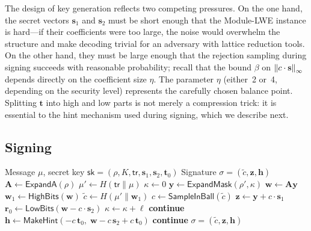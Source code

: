 The design of key generation reflects two competing pressures.  On the one hand, the secret vectors $\mathbf{s}_1$ and $\mathbf{s}_2$ must be short enough that the Module-LWE instance is hard---if their coefficients were too large, the noise would overwhelm the structure and make decoding trivial for an adversary with lattice reduction tools.  On the other hand, they must be large enough that the rejection sampling during signing succeeds with reasonable probability; recall that the bound $\beta$ on $\left\lVert c \cdot \mathbf{s} \right\rVert_\infty$ depends directly on the coefficient size $\eta$.  The parameter $\eta$ (either~2 or~4, depending on the security level) represents the carefully chosen balance point.  Splitting $\mathbf{t}$ into high and low parts is not merely a compression trick: it is essential to the hint mechanism used during signing, which we describe next.

\subsection{Signing}
\label{subsec:ml-dsa-sign}

\begin{algorithm}[t]
\caption{ML-DSA $\Sign$}
\label{alg:ml-dsa-sign}
\begin{algorithmic}[1]
\Require Message $\mu$, secret key $\mathsf{sk} = (\rho, K, \mathsf{tr}, \mathbf{s}_1, \mathbf{s}_2, \mathbf{t}_0)$
\Ensure Signature $\sigma = (\tilde{c}, \mathbf{z}, \mathbf{h})$
\State $\mathbf{A} \gets \mathsf{ExpandA}(\rho)$
\State $\mu' \gets H(\mathsf{tr} \| \mu)$ 
\State $\kappa \gets 0$
\Repeat
  \State $\mathbf{y} \gets \mathsf{ExpandMask}(\rho', \kappa)$ 
  \State $\mathbf{w} \gets \mathbf{A}\mathbf{y}$
  \State $\mathbf{w}_1 \gets \mathsf{HighBits}(\mathbf{w})$ 
  \State $\tilde{c} \gets H(\mu' \| \mathbf{w}_1)$ 
  \State $c \gets \mathsf{SampleInBall}(\tilde{c})$ 
  \State $\mathbf{z} \gets \mathbf{y} + c \cdot \mathbf{s}_1$ 
  \State $\mathbf{r}_0 \gets \mathsf{LowBits}(\mathbf{w} - c \cdot \mathbf{s}_2)$
  \State $\kappa \gets \kappa + \ell$
   
    \State \textbf{continue} 
  \EndIf
  \State $\mathbf{h} \gets \mathsf{MakeHint}(-c\,\mathbf{t}_0,\; \mathbf{w} - c\,\mathbf{s}_2 + c\,\mathbf{t}_0)$ 
    \State \textbf{continue}
  \EndIf
{}
\State \Return $\sigma = (\tilde{c}, \mathbf{z}, \mathbf{h})$
\end{algorithmic}
\end{algorithm}


